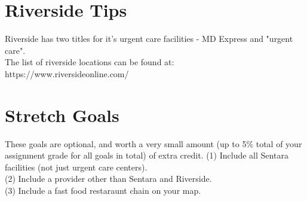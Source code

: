 \documentclass[a4paper, 11pt]{article}
\begin{document}
\section{Riverside Tips}
Riverside has two titles for it's urgent care facilities - MD Express and "urgent care".\\
The list of riverside locations can be found at:\\
https://www.riversideonline.com/

\section{Stretch Goals}
These goals are optional, and worth a very small amount (up to 5\% total of your assignment grade for all goals in total) of extra credit.
(1) Include all Sentara facilities (not just urgent care centers).\\
(2) Include a provider other than Sentara and Riverside.\\
(3) Include a fast food restaraunt chain on your map.
\end{document}
